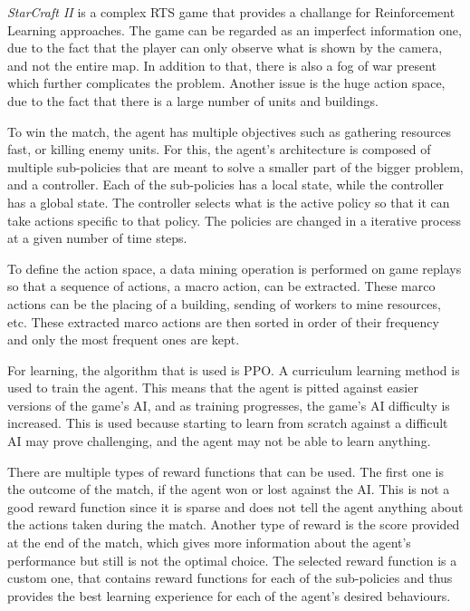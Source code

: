 \emph{StarCraft II} is a complex RTS game that provides a challange for Reinforcement Learning approaches. The game can be regarded as an imperfect information one, due to the fact that the player can only observe what is shown by the camera, and not the entire map. In addition to that, there is also a fog of war present which further complicates the problem. Another issue is the huge action space, due to the fact that there is a large number of units and buildings.

To win the match, the agent has multiple objectives such as gathering resources fast, or killing enemy units. For this, the agent's architecture is composed of multiple sub-policies that are meant to solve a smaller part of the bigger problem, and a controller. Each of the sub-policies has a local state, while the controller has a global state. The controller selects what is the active policy so that it can take actions specific to that policy. The policies are changed in a iterative process at a given number of time steps.

To define the action space, a data mining operation is performed on game replays so that a sequence of actions, a macro action, can be extracted. These marco actions can be the placing of a building, sending of workers to mine resources, etc. These extracted marco actions are then sorted in order of their frequency and only the most frequent ones are kept.

For learning, the algorithm that is used is PPO. A curriculum learning method is used to train the agent. This means that the agent is pitted against easier versions of the game's AI, and as training progresses, the game's AI difficulty is increased. This is used because starting to learn from scratch against a difficult AI may prove challenging, and the agent may not be able to learn anything.

There are multiple types of reward functions that can be used. The first one is the outcome of the match, if the agent won or lost against the AI. This is not a good reward function since it is sparse and does not tell the agent anything about the actions taken during the match. Another type of reward is the score provided at the end of the match, which gives more information about the agent's performance but still is not the optimal choice. The selected reward function is a custom one, that contains reward functions for each of the sub-policies and thus provides the best learning experience for each of the agent's desired behaviours.


